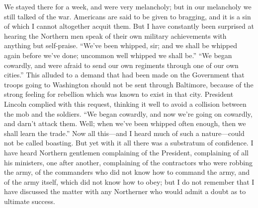 We stayed there for a week, and were very melancholy; but in our
melancholy we still talked of the war.  Americans are said to be
given to bragging, and it is a sin of which I cannot altogether
acquit them.  But I have constantly been surprised at hearing the
Northern men speak of their own military achievements with anything
but self-praise.  ``We've been whipped, sir; and we shall be whipped
again before we've done; uncommon well whipped we shall be.''  ``We
began cowardly, and were afraid to send our own regiments through
one of our own cities.''  This alluded to a demand that had been
made on the Government that troops going to Washington should not
be sent through Baltimore, because of the strong feeling for
rebellion which was known to exist in that city.  President Lincoln
complied with this request, thinking it well to avoid a collision
between the mob and the soldiers.  ``We began cowardly, and now
we're going on cowardly, and darn't attack them.  Well; when we've
been whipped often enough, then we shall learn the trade.''  Now all
this---and I heard much of such a nature---could not be called
boasting.  But yet with it all there was a substratum of
confidence.  I have heard Northern gentlemen complaining of the
President, complaining of all his ministers, one after another,
complaining of the contractors who were robbing the army, of the
commanders who did not know how to command the army, and of the
army itself, which did not know how to obey; but I do not remember
that I have discussed the matter with any Northerner who would
admit a doubt as to ultimate success.

